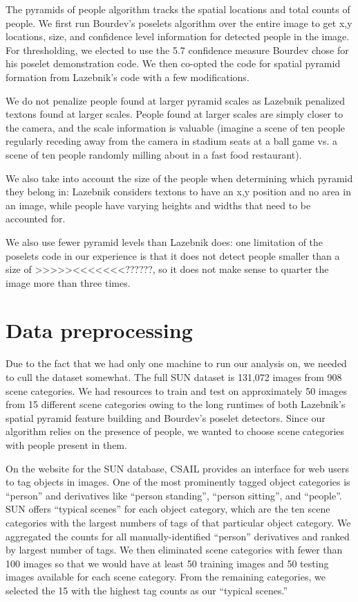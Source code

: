 \documentclass[11pt]{article}
\begin{document}
The pyramids of people algorithm tracks the spatial locations and total counts of people.  We first run Bourdev's poselets algorithm over the entire image to get x,y locations, size, and confidence level information for detected people in the image.  For thresholding, we elected to use the 5.7 confidence measure Bourdev chose for his poselet demonstration code.  We then co-opted the code for spatial pyramid formation from Lazebnik's code with a few modifications.

We do not penalize people found at larger pyramid scales as Lazebnik penalized textons found at larger scales.  People found at larger scales are simply closer to the camera, and the scale information is valuable (imagine a scene of ten people regularly receding away from the camera in stadium seats at a ball game vs. a scene of ten people randomly milling about in a fast food restaurant).

We also take into account the size of the people when determining which pyramid they belong in: Lazebnik considers textons to have an x,y position and no area in an image, while people have varying heights and widths that need to be accounted for.

We also use fewer pyramid levels than Lazebnik does: one limitation of the poselets code in our experience is that it does not detect people smaller than a size of >>>>><<<<<<<??????, so it does not make sense to quarter the image more than three times.

\section{Data preprocessing}

Due to the fact that we had only one machine to run our analysis on, we needed to cull the dataset somewhat.  The full SUN dataset is 131,072 images from 908 scene categories.  We had resources to train and test on approximately 50 images from 15 different scene categories owing to the long runtimes of both Lazebnik's spatial pyramid feature building and Bourdev's poselet detectors.  Since our algorithm relies on the presence of people, we wanted to choose scene categories with people present in them.

On the website for the SUN database, CSAIL provides an interface for web users to tag objects in images.  One of the most prominently tagged object categories is ``person'' and derivatives like ``person standing'', ``person sitting'', and ``people''.  SUN offers ``typical scenes'' for each object category, which are the ten scene categories with the largest numbers of tags of that particular object category.  We aggregated the counts for all manually-identified ``person'' derivatives and ranked by largest number of tags.  We then eliminated scene categories with fewer than 100 images so that we would have at least 50 training images and 50 testing images available for each scene category.  From the remaining categories, we selected the 15 with the highest tag counts as our ``typical scenes.''
\end{document}
